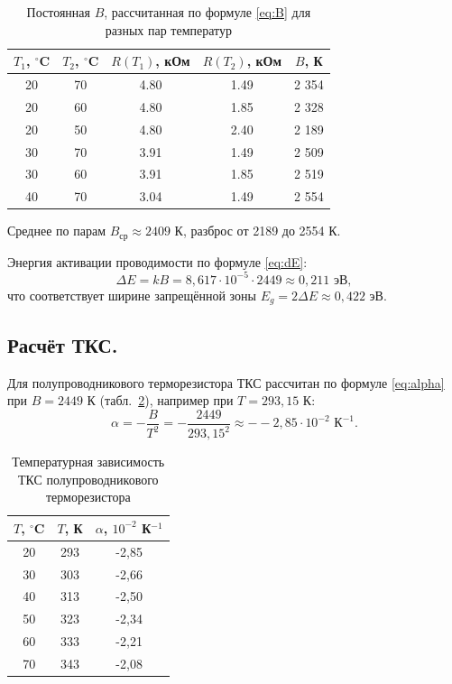 \documentclass[12pt, a4paper]{article}
\begin{document}
	\begin{table}[H]
		\caption{Постоянная $B$, рассчитанная по формуле \eqref{eq:B} для разных пар температур}
		\label{tab:B}
		\centering
		\begin{tabular}{|c|c|c|c|c|}
			\hline
			$T_1$, $^\circ$C & $T_2$, $^\circ$C & $R(T_1)$, кОм & $R(T_2)$, кОм & $B$, К \\
			\hline
			20 & 70 & 4.80 & 1.49 & 2 354 \\ \hline
			20 & 60 & 4.80 & 1.85 & 2 328 \\ \hline
			20 & 50 & 4.80 & 2.40 & 2 189 \\ \hline
			30 & 70 & 3.91 & 1.49 & 2 509 \\ \hline
			30 & 60 & 3.91 & 1.85 & 2 519 \\ \hline
			40 & 70 & 3.04 & 1.49 & 2 554 \\ \hline
		\end{tabular}
	\end{table}
	
	Среднее по парам $B_{\text{ср}} \approx 2409$ К, разброс от 2189 до 2554 К.
	
	Энергия активации проводимости по формуле \eqref{eq:dE}:
	\[
	\Delta E = kB = 8{,}617 \cdot 10^{-5} \cdot 2449 \approx 0,211 \text{ эВ},
	\]
	что соответствует ширине запрещённой зоны $E_g = 2\Delta E \approx 0,422$ эВ.
	
	\subsection{Расчёт ТКС.}
	Для полупроводникового терморезистора ТКС рассчитан по формуле \eqref{eq:alpha} при $B = 2449$ К (табл.~\ref{tab:alpha}), например при $T = 293{,}15$ К:
	\[
	\alpha = -\frac{B}{T^2} = -\frac{2449}{293{,}15^2} \approx --2,85 \cdot 10^{-2} \text{ К}^{-1}.
	\]
	
	\begin{table}[H]
		\caption{Температурная зависимость ТКС полупроводникового терморезистора}
		\label{tab:alpha}
		\centering
		\begin{tabular}{|c|c|c|}
			\hline
			$T$, $^\circ$C & $T$, К & $\alpha$, $10^{-2}$ К$^{-1}$ \\
			\hline
			20 & 293 & -2,85 \\ \hline
			30 & 303 & -2,66 \\ \hline
			40 & 313 & -2,50 \\ \hline
			50 & 323 & -2,34 \\ \hline
			60 & 333 & -2,21 \\ \hline
			70 & 343 & -2,08 \\ \hline
		\end{tabular}
	\end{table}
	
\end{document}
